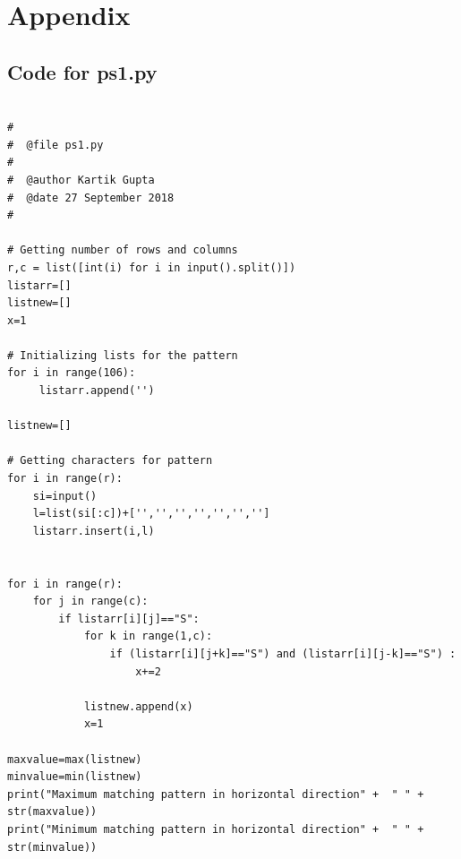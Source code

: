 \documentclass[12pt]{article}
\begin{document}
\newpage



\section{Appendix}        
\subsection{Code for ps1.py}
\begin{lstlisting}[style=CStyle]

#
#  @file ps1.py
#
#  @author Kartik Gupta
#  @date 27 September 2018
#

# Getting number of rows and columns
r,c = list([int(i) for i in input().split()])
listarr=[]
listnew=[]
x=1

# Initializing lists for the pattern
for i in range(106):
     listarr.append('')

listnew=[]

# Getting characters for pattern
for i in range(r):
    si=input()
    l=list(si[:c])+['','','','','','','']
    listarr.insert(i,l)


for i in range(r):
    for j in range(c):
        if listarr[i][j]=="S":
            for k in range(1,c):
                if (listarr[i][j+k]=="S") and (listarr[i][j-k]=="S") :
                    x+=2

            listnew.append(x)
            x=1

maxvalue=max(listnew)
minvalue=min(listnew)
print("Maximum matching pattern in horizontal direction" +  " " + str(maxvalue))
print("Minimum matching pattern in horizontal direction" +  " " + str(minvalue))

\end{lstlisting}     
     
\newpage
     
\end{document}
